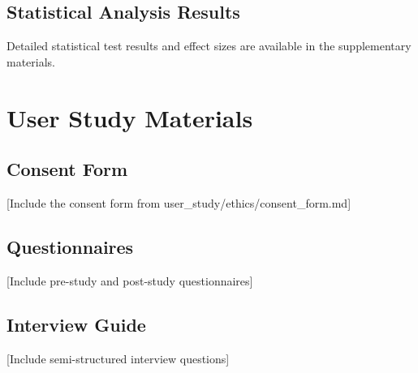 \documentclass[12pt,a4paper,twoside]{report}
\theoremstyle{definition}
\begin{document}
\section{Statistical Analysis Results}
Detailed statistical test results and effect sizes are available in the supplementary materials.

\chapter{User Study Materials}
\section{Consent Form}
[Include the consent form from user\_study/ethics/consent\_form.md]

\section{Questionnaires}
[Include pre-study and post-study questionnaires]

\section{Interview Guide}
[Include semi-structured interview questions]
\end{document}
